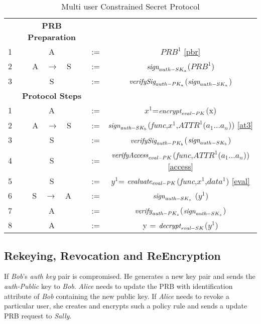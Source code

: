 \documentclass[conference]{IEEEtran}
\numberwithin{equation}{section}
\begin{document}
\begin{table}
\caption{Multi user Constrained Secret Protocol }
\label{mcspProtocol}
\renewcommand{\arraystretch}{2.5}
\begin{center}
\begin{tabular} {| c c c c | }
\hline
&\bf{PRB Preparation}&&  \\
{1}&{A}&{:=}&{{$PRB^1$} \eqref{pbr}} \\
{2}&{A$\quad \rightarrow \quad$S}&{:=}&{$\emph{sign}_{auth-SK_a}$($PRB^1$)} \\
{3}&{S}&{:=}&{$\emph{verifySig}_{auth-PK_a}$($\emph{sign}_{auth-SK_a}$)} \\
\hline
\hline
&\bf{Protocol Steps}&&  \\
{1}&{A}&{:=}&{{$x^1$}=$\emph{encrypt}_{\emph{eval}-PK}$(x)} \\
{2}&{A$\quad \rightarrow \quad$S}&{:=}&{ $\emph{sign}_{\emph{auth}-SK_b}$(\emph{func},$x^1$,$ATTR^1$({$a_1$...$a_n$)}) \eqref{at3} } \\
{3}&{S}&{:=}&{$\emph{verifySig}_{\emph{auth}-PK_b}$($\emph{sign}_{auth-SK_b}$)} \\
{4}&{S}&{:=}&{$\emph{verifyAccess}_{\emph{eval}-PK}$(\emph{func},$ATTR^1$({$a_1$...$a_n$)}) \eqref{access}} \\
{5}&{S}&{:=}&{ {$y^1$}= $\emph{evaluate}_{\emph{eval}-PK}$(\emph{func},$x^1$,$data^1$) \eqref{eval}} \\
{6}&{S$\quad \rightarrow \quad$A}&{:=}&{ $\emph{sign}_{\emph{auth}-SK_s}$ ($y^1$)} \\
{7}&{A}&{:=}&{ $\emph{verify}_{\emph{auth}-PK_s}$($\emph{sign}_{\emph{auth}-SK_s}$) } \\
{8}&{A}&{:=}&{y =  $\emph{decrypt}_{\emph{eval}-SK}$($y^1$)} \\
\hline
\end{tabular} 
\end{center}
\end{table}
\subsection{Rekeying, Revocation and ReEncryption}

If \emph{Bob}'s \emph{auth key} pair is compromised. He generates a new key pair and sends the \emph{auth-Public} key to \emph{Bob}. \emph{Alice} needs to update the PRB with identification attribute of \emph{Bob} containing the new public key.
If \emph{Alice} needs to revoke a particular user, she creates and encrypts such a policy rule and sends a update PRB request to \emph{Sally}.
\end{document}
